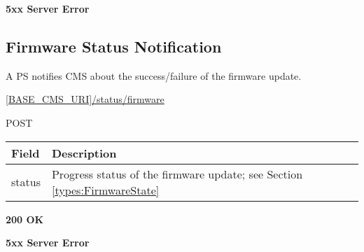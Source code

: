  \textbf{5xx Server Error}


\subsection{Firmware Status Notification}

A \acs{PS} notifies \acs{CMS} about the success/failure of the firmware update. 

 \url{[BASE_CMS_URI]/status/firmware}

 POST

\begin{tabularx}{\linewidth}{ | l | X | }
  \hline
  \rowcolor{table-head}
  Field & Description \\
  \hline
  	status			& Progress status of the firmware update; see Section \ref{types:FirmwareState} \\	
  \hline
\end{tabularx}

 \textbf{200 OK}

 \textbf{5xx Server Error}